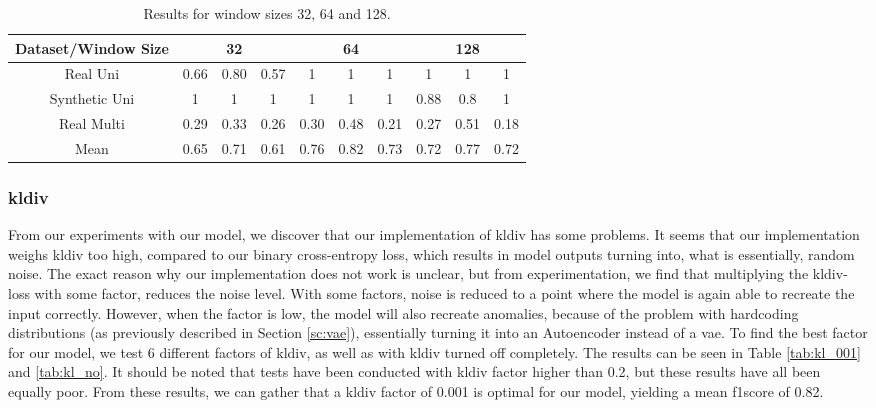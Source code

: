 \bgroup
\def\arraystretch{1.8}
\begin{table}[htbp]
\centering
\begin{tabular}{|c|c|c|c|c|c|c|c|c|c|}
\hline
Dataset/Window Size & \multicolumn{3}{c|}{32} & \multicolumn{3}{c|}{64} & \multicolumn{3}{c|}{128} \\ \hline
Real Uni      & 0.66   & 0.80   & 0.57  & 1      & 1      & 1     & 1      & 1      & 1      \\ \hline
Synthetic Uni & 1      & 1      & 1     & 1      & 1      & 1     & 0.88   & 0.8    & 1      \\ \hline
Real Multi    & 0.29   & 0.33   & 0.26  & 0.30   & 0.48   & 0.21  & 0.27   & 0.51   & 0.18   \\ \hline
Mean          & 0.65   & 0.71   & 0.61  & 0.76   & 0.82   & 0.73  & 0.72   & 0.77   & 0.72   \\ \hline
\end{tabular}
\caption{Results for window sizes 32, 64 and 128.}
\label{tab:ws_128}
\end{table}
\egroup

\subsubsection{\gls{kldiv}}
From our experiments with our model, we discover that our implementation of \gls{kldiv} has some problems.
It seems that our implementation weighs \gls{kldiv} too high, compared to our binary cross-entropy loss, which results in model outputs turning into, what is essentially, random noise. The exact reason why our implementation does not work is unclear, but from experimentation, we find that multiplying the \gls{kldiv}-loss with some factor, reduces the noise level. With some factors, noise is reduced to a point where the model is again able to recreate the input correctly. However, when the factor is low, the model will also recreate anomalies, because of the problem with hardcoding distributions (as previously described in Section \ref{sc:vae}), essentially turning it into an Autoencoder instead of a \gls{vae}. To find the best factor for our model, we test 6 different factors of \gls{kldiv}, as well as with \gls{kldiv} turned off completely. The results can be seen in Table \ref{tab:kl_001} and \ref{tab:kl_no}. It should be noted that tests have been conducted with \gls{kldiv} factor higher than 0.2, but these results have all been equally poor. From these results, we can gather that a \gls{kldiv} factor of 0.001 is optimal for our model, yielding a mean \gls{f1score} of 0.82.

